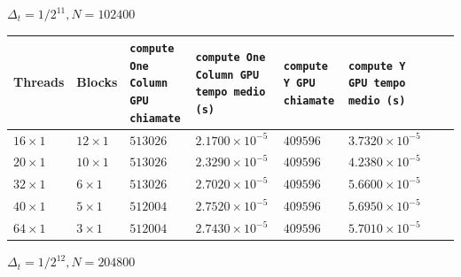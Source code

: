 \newpage
\begin{center}
    $\Delta _t = 1 / 2^{11}, N = 102400$    
\end{center}

\begin{table}[h!]
    \centering
    \begin{tabularx}{1\textwidth} { 
      | >{\centering\arraybackslash}X 
      | >{\centering\arraybackslash}X
      | >{\centering\arraybackslash}X
      | >{\centering\arraybackslash}X
      | >{\centering\arraybackslash}X
      | >{\centering\arraybackslash}X
      | >{\centering\arraybackslash}X
      | >{\centering\arraybackslash}X|
    }
    \hline  Threads & Blocks & \texttt{compute One Column GPU chiamate} & \texttt{compute One Column GPU tempo medio (s)} & \texttt{compute Y GPU chiamate} & \texttt{compute Y GPU tempo medio (s)} \\
    \hline $16 \times 1$ & $12 \times 1$ & $513026$ & $2.1700 \times 10^{-5}$ & $409596$ & $3.7320 \times 10^{-5}$ \\
    \hline $20 \times 1$ & $10 \times 1$ & $513026$ & $2.3290 \times 10^{-5}$ & $409596$ & $4.2380 \times 10^{-5}$ \\
    \hline $32 \times 1$ & $6 \times 1$ & $513026$ & $2.7020 \times 10^{-5}$ & $409596$ & $5.6600 \times 10^{-5}$ \\
    \hline $40 \times 1$ & $5 \times 1$ & $512004$ & $2.7520 \times 10^{-5}$ & $409596$ & $5.6950 \times 10^{-5}$ \\
    \hline $64 \times 1$ & $3 \times 1$ & $512004$ & $2.7430 \times 10^{-5}$ & $409596$ & $5.7010 \times 10^{-5}$ \\
    \hline
    \end{tabularx}
    \label{tab:second_macro_module_time_N_102400}
\end{table}
\vspace{0.2cm}

\newpage 
\noindent
\begin{center}
    $\Delta _t = 1 / 2^{12}, N = 204800$    
\end{center}

